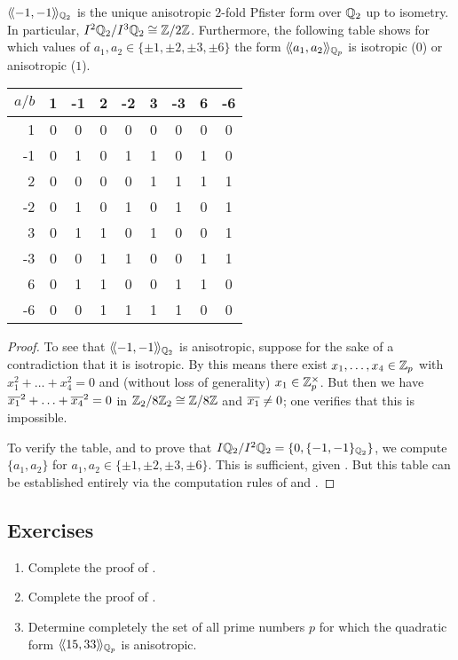 \documentclass[12pt, leqno, british]{amsart}
\begin{document}
\begin{prop}\label{P:2-fold-Pfister-qq2}
$\langle\!\langle -1, -1 \rangle\!\rangle_{\mathbb Q_2}$ is the unique anisotropic $2$-fold Pfister form over $\mathbb Q_2$ up to isometry.
In particular, $I^2\mathbb Q_2/I^3\mathbb Q_2 \cong \mathbb Z/2\mathbb Z$.
Furthermore, the following table shows for which values of $a_1, a_2 \in \lbrace \pm 1, \pm 2, \pm 3, \pm 6 \rbrace$ the form $\langle\!\langle a_1, a_2 \rangle\!\rangle_{\mathbb Q_p}$ is isotropic ($0$) or anisotropic ($1$).

\centering
\begin{tabular}{r | c c c c c c c c}
$a/b$ & 1 & -1 & 2 & -2 & 3 & -3 & 6 & -6 \\ \hline
1 & 0 & 0 & 0 & 0 & 0 & 0 & 0 & 0 \\
-1 & 0 & 1 & 0 & 1 & 1& 0 & 1 & 0 \\
2 & 0 & 0 & 0 & 0 & 1 & 1 & 1 & 1 \\
-2 & 0 & 1 & 0 & 1 & 0 & 1 & 0 & 1 \\
3 & 0 & 1 & 1 & 0 & 1 & 0 & 0 & 1\\
-3 & 0 & 0 & 1 & 1 & 0 & 0 & 1 & 1 \\
6 & 0 & 1 & 1 & 0 & 0 & 1 & 1 & 0 \\
-6 & 0 & 0 & 1 & 1 & 1 & 1 & 0 & 0
\end{tabular}
\end{prop}
\begin{proof}
To see that $\langle\!\langle -1, -1 \rangle\!\rangle_{\mathbb Q_2}$ is anisotropic, suppose for the sake of a contradiction that it is isotropic.
By  this means there exist $x_1, \ldots, x_4 \in \mathbb Z_p$ with $x_1^2 + \ldots + x_4^2 = 0$ and (without loss of generality) $x_1 \in \mathbb Z_p^\times$.
But then we have $\overline{x_1}^2 + \ldots + \overline{x_4}^2 = 0$ in $\mathbb Z_2/8\mathbb Z_2 \cong \mathbb Z/8\mathbb Z$ and $\overline{x_1} \neq 0$; one verifies that this is impossible.

To verify the table, and to prove that $I\mathbb Q_2/I^2\mathbb Q_2 = \lbrace 0, \lbrace -1, -1 \rbrace_{\mathbb Q_2} \rbrace$, we compute $\lbrace a_1, a_2 \rbrace$ for $a_1, a_2 \in \lbrace \pm 1, \pm 2, \pm 3, \pm 6 \rbrace$. This is sufficient, given .
But this table can be established entirely via the computation rules of  and .
\end{proof}

\subsection{Exercises}
\begin{enumerate}
\item Complete the proof of .
\item Complete the proof of .
\item Determine completely the set of all prime numbers $p$ for which the quadratic form $\langle\!\langle 15, 33 \rangle\!\rangle_{\mathbb Q_p}$ is anisotropic.
\end{enumerate}
\end{document}
